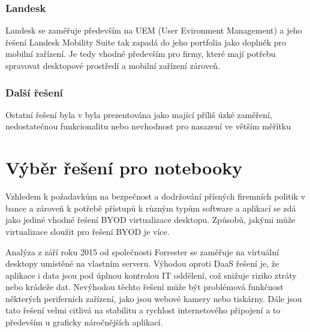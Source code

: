 \subsubsection{Landesk}
Landesk se zaměřuje především na UEM (User Evironment Management) a jeho řešení Landesk Mobility Suite tak zapadá do jeho portfolia jako doplněk pro mobilní zařízení. Je tedy vhodné především pro firmy, které mají potřebu spravovat desktopové prostředí a mobilní zařízení zároveň.

\subsubsection{Další řešení}
Ostatní řešení byla v \cite{Gartner_EMM_2016} byla prezentována jako mající příliš úzké zaměření, nedostatečnou funkcionalitu nebo nevhodnost pro nasazení ve větším měřítku


\section{Výběr řešení pro notebooky}

Vzhledem k požadavkům na bezpečnost a dodržování přísných firemních politik v bance a zároveň k potřebě přístupů k různým typům software a aplikací se zdá jako jediné vhodné řešení BYOD virtualizace desktopu. Způsobů, jakými může virtualizace sloužit pro řešení BYOD je více.

Analýza \cite{ForresterWave} z září roku 2015 od společnosti Forrester se zaměřuje na virtuální desktopy umístěné na vlastním serveru. Výhodou oproti DaaS řešení je, že aplikace i data jsou pod úplnou kontrolou IT oddělení, což snižuje riziko ztráty nebo krádeže dat. Nevýhodou těchto řešení může být problémová funkčnost některých periferních zařízení, jako jsou webové kamery nebo tiskárny. Dále jsou tato řešení velmi citlivá na stabilitu a rychlost internetového připojení a to především u graficky náročnějších aplikací. 

